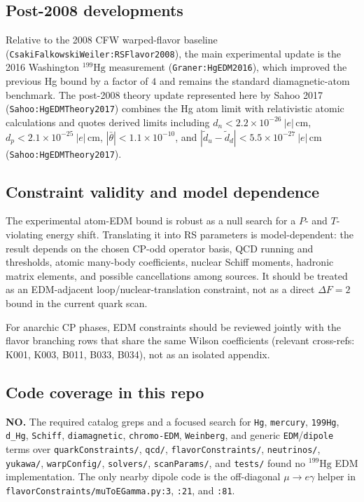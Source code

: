 \subsection*{Post-2008 developments}
Relative to the 2008 CFW warped-flavor baseline
(\texttt{CsakiFalkowskiWeiler:RSFlavor2008}), the main experimental update is
the 2016 Washington \(^{199}\mathrm{Hg}\) measurement
(\texttt{Graner:HgEDM2016}), which improved the previous Hg bound by a factor
of \(4\) and remains the standard diamagnetic-atom benchmark.  The post-2008
theory update represented here by Sahoo 2017
(\texttt{Sahoo:HgEDMTheory2017}) combines the Hg atom limit with relativistic
atomic calculations and quotes derived limits including
\(d_n<2.2\times10^{-26}\ |e|\,\mathrm{cm}\),
\(d_p<2.1\times10^{-25}\ |e|\,\mathrm{cm}\),
\(|\bar\theta|<1.1\times10^{-10}\), and
\(|\tilde d_u-\tilde d_d|<5.5\times10^{-27}\ |e|\,\mathrm{cm}\)
(\texttt{Sahoo:HgEDMTheory2017}).

\subsection*{Constraint validity and model dependence}
The experimental atom-EDM bound is robust as a null search for a
\(P\)- and \(T\)-violating energy shift.  Translating it into RS parameters is
model-dependent: the result depends on the chosen CP-odd operator basis,
QCD running and thresholds, atomic many-body coefficients, nuclear Schiff
moments, hadronic matrix elements, and possible cancellations among sources.
It should be treated as an EDM-adjacent loop/nuclear-translation constraint,
not as a direct \(\Delta F=2\) bound in the current quark scan.

For anarchic CP phases, EDM constraints should be reviewed jointly with the
flavor branching rows that share the same Wilson coefficients (relevant
cross-refs: K001, K003, B011, B033, B034), not as an isolated appendix.

\subsection*{Code coverage in this repo}
\textbf{NO.}  The required catalog greps and a focused search for
\texttt{Hg}, \texttt{mercury}, \texttt{199Hg}, \texttt{d\_Hg},
\texttt{Schiff}, \texttt{diamagnetic}, \texttt{chromo-EDM},
\texttt{Weinberg}, and generic \texttt{EDM}/\texttt{dipole} terms over
\texttt{quarkConstraints/}, \texttt{qcd/}, \texttt{flavorConstraints/},
\texttt{neutrinos/}, \texttt{yukawa/}, \texttt{warpConfig/},
\texttt{solvers/}, \texttt{scanParams/}, and \texttt{tests/} found no
\(^{199}\mathrm{Hg}\) EDM implementation.  The only nearby dipole code is the
off-diagonal \(\mu\to e\gamma\) helper in
\texttt{flavorConstraints/muToEGamma.py:3}, \texttt{:21}, and \texttt{:81}.

